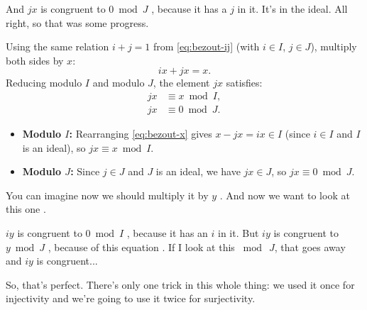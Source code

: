 \begin{proofWrapper}
\begin{speech}[00:10:38 - 00:12:02]
And $jx$ is congruent to $0 \bmod J$ , because it has a $j$ in it. It's in the ideal. All right, so that was some progress.
\end{speech}

\begin{content}
Using the same relation $i + j = 1$ from \eqref{eq:bezout-ij} (with $i \in I$, $j \in J$), multiply both sides by $x$:
\begin{equation}\label{eq:bezout-x}
ix + jx = x.
\end{equation}
Reducing modulo $I$ and modulo $J$, the element $jx$ satisfies:
\begin{align}
jx &\equiv x \bmod I, \label{eq:jx-mod-i} \\
jx &\equiv 0 \bmod J. \label{eq:jx-mod-j}
\end{align}

\begin{steps}
\begin{itemize}
    \item \textbf{Modulo $I$:} Rearranging \eqref{eq:bezout-x} gives $x - jx = ix \in I$ (since $i \in I$ and $I$ is an ideal), so $jx \equiv x \bmod I$.
    \item \textbf{Modulo $J$:} Since $j \in J$ and $J$ is an ideal, we have $jx \in J$, so $jx \equiv 0 \bmod J$.
\end{itemize}
\end{steps}
\end{content}

\begin{speech}[00:12:02 - 00:12:49]
You can imagine now we should multiply it by $y$ . And now we want to look at this one .

$iy$ is congruent to $0 \bmod I$ , because it has an $i$ in it. But $iy$ is congruent to $y \bmod J$ , because of this equation . If I look at this $\bmod\ J$, that  goes away and $iy$ is congruent...

So, that's perfect. There's only one trick in this whole thing: we used it once for injectivity and we're going to use it twice for surjectivity.
\end{speech}


\end{proofWrapper}
